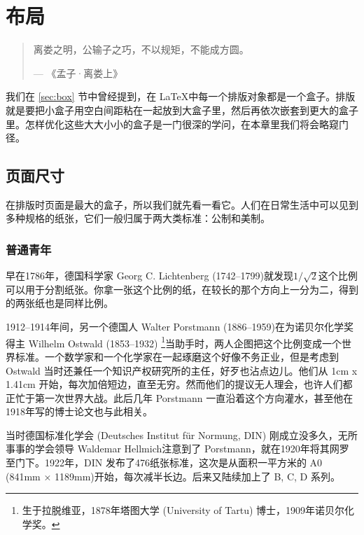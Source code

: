 \chapter{布局}

\begin{quotation}
离娄之明，公输子之巧，不以规矩，不能成方圆。
\begin{flushright}
--- 《孟子·离娄上》
\end{flushright}
\end{quotation}

我们在 \ref{sec:box} 节中曾经提到，在 \LaTeX 中每一个排版对象都是一个盒子。排版就是要把小盒子用空白间距粘在一起放到大盒子里，然后再依次嵌套到更大的盒子里。怎样优化这些大大小小的盒子是一门很深的学问，在本章里我们将会略窥门径。

\section{页面尺寸}

在排版时页面是最大的盒子，所以我们就先看一看它。人们在日常生活中可以见到多种规格的纸张，它们一般归属于两大类标准：公制和美制。

\subsection{普通青年}

早在1786年，德国科学家 Georg C. Lichtenberg (1742--1799)\indexLichtenberg 就发现$1/\sqrt{2}$这个比例可以用于分割纸张。你拿一张这个比例的纸，在较长的那个方向上一分为二，得到的两张纸也是同样比例。

1912--1914年间，另一个德国人 Walter Porstmann (1886--1959)\indexPorstmann 在为诺贝尔化学奖得主 Wilhelm Ostwald (1853--1932)\indexOstwald{} \footnote{生于拉脱维亚，1878年塔图大学 (University of Tartu) 博士，1909年诺贝尔化学奖。}当助手时，两人企图把这个比例变成一个世界标准。一个数学家和一个化学家在一起琢磨这个好像不务正业，但是考虑到 Ostwald 当时还兼任一个知识产权研究所的主任，好歹也沾点边儿。他们从 1cm x 1.41cm 开始，每次加倍短边，直至无穷。然而他们的提议无人理会，也许人们都正忙于第一次世界大战。此后几年 Porstmann 一直沿着这个方向灌水，甚至他在1918年写的博士论文也与此相关。

当时德国标准化学会 (Deutsches Institut für Normung, DIN) 刚成立没多久，无所事事的学会领导 Waldemar Hellmich\indexHellmich 注意到了 Porstmann，就在1920年将其网罗至门下。1922年，DIN 发布了476纸张标准，这次是从面积一平方米的 A0 (841mm × 1189mm)开始，每次减半长边。后来又陆续加上了 B, C, D 系列。

